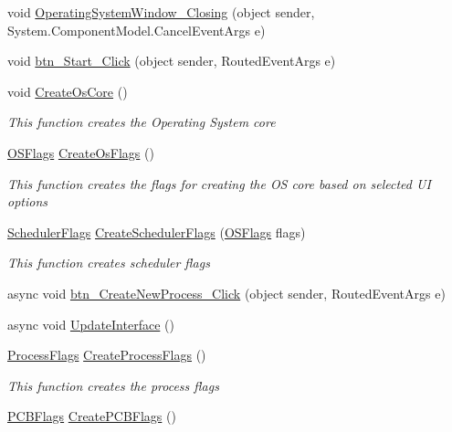 \begin{DoxyCompactItemize}
\item 
void \hyperlink{class_c_p_u___o_s___simulator_1_1_operating_system_main_window_a5e823b50dfab668d8e61d9d3ecea300c}{Operating\+System\+Window\+\_\+\+Closing} (object sender, System.\+Component\+Model.\+Cancel\+Event\+Args e)
\item 
void \hyperlink{class_c_p_u___o_s___simulator_1_1_operating_system_main_window_a49ee2facd64a57c8a3450ccd5582dfff}{btn\+\_\+\+Start\+\_\+\+Click} (object sender, Routed\+Event\+Args e)
\item 
void \hyperlink{class_c_p_u___o_s___simulator_1_1_operating_system_main_window_a61584b7f34a107e1c8c6cbbaff17641d}{Create\+Os\+Core} ()
\begin{DoxyCompactList}\small\item\em This function creates the Operating System core \end{DoxyCompactList}\item 
\hyperlink{struct_c_p_u___o_s___simulator_1_1_operating___system_1_1_o_s_flags}{O\+S\+Flags} \hyperlink{class_c_p_u___o_s___simulator_1_1_operating_system_main_window_aedcaa8273429f3867b3a2419981e4ca1}{Create\+Os\+Flags} ()
\begin{DoxyCompactList}\small\item\em This function creates the flags for creating the O\+S core based on selected U\+I options \end{DoxyCompactList}\item 
\hyperlink{struct_c_p_u___o_s___simulator_1_1_operating___system_1_1_scheduler_flags}{Scheduler\+Flags} \hyperlink{class_c_p_u___o_s___simulator_1_1_operating_system_main_window_affe29a16b5dcb4faa896fd12b87268f6}{Create\+Scheduler\+Flags} (\hyperlink{struct_c_p_u___o_s___simulator_1_1_operating___system_1_1_o_s_flags}{O\+S\+Flags} flags)
\begin{DoxyCompactList}\small\item\em This function creates scheduler flags \end{DoxyCompactList}\item 
async void \hyperlink{class_c_p_u___o_s___simulator_1_1_operating_system_main_window_a07752984a7eedac5dab517b7f57b9af2}{btn\+\_\+\+Create\+New\+Process\+\_\+\+Click} (object sender, Routed\+Event\+Args e)
\item 
async void \hyperlink{class_c_p_u___o_s___simulator_1_1_operating_system_main_window_a531d8240782c578c6fc5984c703ddffb}{Update\+Interface} ()
\item 
\hyperlink{struct_c_p_u___o_s___simulator_1_1_operating___system_1_1_process_flags}{Process\+Flags} \hyperlink{class_c_p_u___o_s___simulator_1_1_operating_system_main_window_aa44b77efc3ae2c300ebb19e6854c3290}{Create\+Process\+Flags} ()
\begin{DoxyCompactList}\small\item\em This function creates the process flags \end{DoxyCompactList}\item 
\hyperlink{struct_c_p_u___o_s___simulator_1_1_operating___system_1_1_p_c_b_flags}{P\+C\+B\+Flags} \hyperlink{class_c_p_u___o_s___simulator_1_1_operating_system_main_window_a0994a475aa1e602964f610cce778b117}{Create\+P\+C\+B\+Flags} ()
\end{DoxyCompactItemize}
